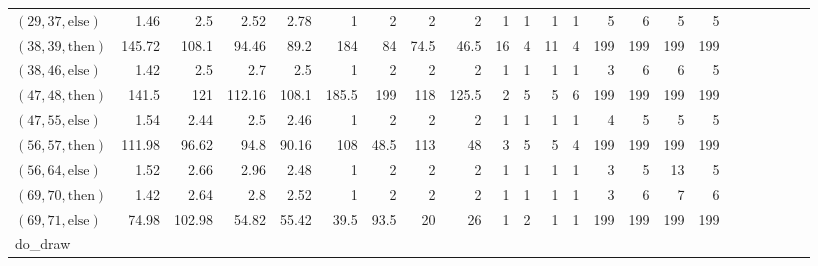 \documentclass[sigconf]{acmart}
\newcommand{\thenBr}{\text{then}}
\newcommand{\elseBr}{\text{else}}
\begin{document}
\begin{table*}
{\begin{tabular}{l|rrrr|rrrr|rrrr|rrrr|r|r|r|r|r|r}
    $(29,37,\elseBr)$ & 1.46        & 2.5         & 2.52           & 2.78          & 1     & 2     & 2       & 2       & 1        & 1        & 1          & 1           & 5        & 6       & 5          & 5 & & & & & & \\
    $(38,39,\thenBr)$ & 145.72      & 108.1       & 94.46          & 89.2          & 184   & 84    & 74.5    & 46.5    & 16       & 4        & 11         & 4           & 199      & 199     & 199        & 199& & & & & & \\
    $(38,46,\elseBr)$ & 1.42        & 2.5         & 2.7            & 2.5           & 1     & 2     & 2       & 2       & 1        & 1        & 1          & 1           & 3        & 6       & 6          & 5 & & & & & & \\
    $(47,48,\thenBr)$ & 141.5       & 121         & 112.16         & 108.1         & 185.5 & 199   & 118     & 125.5   & 2        & 5        & 5          & 6           & 199      & 199     & 199        & 199 & & & & & & \\
    $(47,55,\elseBr)$ & 1.54        & 2.44        & 2.5            & 2.46          & 1     & 2     & 2       & 2       & 1        & 1        & 1          & 1           & 4        & 5       & 5          & 5 & & & & & & \\
    $(56,57,\thenBr)$ & 111.98      & 96.62       & 94.8           & 90.16         & 108   & 48.5  & 113     & 48      & 3        & 5        & 5          & 4           & 199      & 199     & 199        & 199 & & & & & & \\
    $(56,64,\elseBr)$ & 1.52        & 2.66        & 2.96           & 2.48          & 1     & 2     & 2       & 2       & 1        & 1        & 1          & 1           & 3        & 5       & 13         & 5 & & & & & & \\
    $(69,70,\thenBr)$ & 1.42        & 2.64        & 2.8            & 2.52          & 1     & 2     & 2       & 2       & 1        & 1        & 1          & 1           & 3        & 6       & 7          & 6 & & & & & & \\
    $(69,71,\elseBr)$ & 74.98       & 102.98      & 54.82          & 55.42         & 39.5  & 93.5  & 20      & 26      & 1        & 2        & 1          & 1           & 199      & 199     & 199        & 199 & & & & & & \\
    \midrule
    \midrule
    do\_draw           &             &            &               &                &       &       &         &         &           &          &           &             &          &          &           & & & & & & & \\

\end{tabular}}
\end{table*}
\end{document}
